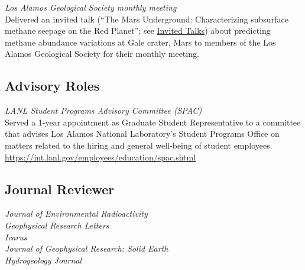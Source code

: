 \documentclass[11pt, letterpaper]{article}
\newcommand{\years}[1]{\marginnote{\scriptsize #1}}
\begin{document}
{{\years{April 2023} \textit{Los Alamos Geological Society monthly meeting}\\
Delivered an invited talk (``The Mars Underground: Characterizing subsurface
methane seepage on the Red Planet''; see \href{sec:invitedTalks}{Invited
Talks}) about predicting methane abundance variations at Gale crater, Mars to
members of the Los Alamos Geological Society for their monthly meeting. %


\subsection*{Advisory Roles}\noindent
\hypersetup{linkcolor=black,citecolor=blue,filecolor=black,urlcolor=blue}
\years{2018 - 2019} \textit{LANL Student Programs Advisory Committee (SPAC)}\\
Served a 1-year appointment as Graduate Student Representative to a
committee that advises Los Alamos National Laboratory's Student Programs Office
on matters related to the hiring and general well-being of student employees.\\
\href{https://int.lanl.gov/employees/education/spac.shtml}{https://int.lanl.gov/employees/education/spac.shtml}



\subsection*{Journal Reviewer}

    \textit{Journal of Environmental Radioactivity}\\
    \textit{Geophysical Research Letters}\\
    \textit{Icarus}\\
    \textit{Journal of Geophysical Research: Solid Earth}\\
    \textit{Hydrogeology Journal}







}}
\end{document}
